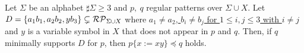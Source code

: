 
\begin{lem}\label{lem:3consts_ii}
  Let $\Sigma$ be an alphabet $\sharp\Sigma \ge 3$ and $p,~q$ regular patterns {\color{red}over} $\Sigma\cup X$.
  {\color{red} Let $D= \{ a_{1}b_{1}, a_{2}b_{2}, yb_{3}\}\subsetneq \mathcal{RP}_{\Sigma\cup X}$
  where \underline{$a_{1}\neq a_{2}$, $b_{i}\neq b_{j}$ for $1\leq i,j\leq 3$ with $i\neq j$}\\ and $y$ is a variable symbol in $X$ that does not appear in $p$ and $q$.
  Then, 
  {\color{red} 
if $q$ minimally supports $D$ for $p$,
}
then $p \{ x := xy \} \preceq q$ holds.}
\end{lem}


